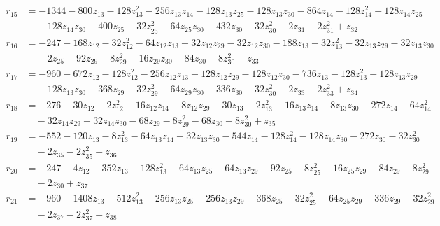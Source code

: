 \begin{align*}
r_{15} &= -1344 - 800z_{13} - 128z_{13}^{2} - 256z_{13}z_{14} - 128z_{13}z_{25} - 128z_{13}z_{30} - 864z_{14} - 128z_{14}^{2} - 128z_{14}z_{25} \\
&\quad  - 128z_{14}z_{30} - 400z_{25} - 32z_{25}^{2} - 64z_{25}z_{30} - 432z_{30} - 32z_{30}^{2} - 2z_{31} - 2z_{31}^{2} + z_{32}
\end{align*}
\begin{align*}
r_{16} &= -247 - 168z_{12} - 32z_{12}^{2} - 64z_{12}z_{13} - 32z_{12}z_{29} - 32z_{12}z_{30} - 188z_{13} - 32z_{13}^{2} - 32z_{13}z_{29} - 32z_{13}z_{30} \\
&\quad  - 2z_{25} - 92z_{29} - 8z_{29}^{2} - 16z_{29}z_{30} - 84z_{30} - 8z_{30}^{2} + z_{33}
\end{align*}
\begin{align*}
r_{17} &= -960 - 672z_{12} - 128z_{12}^{2} - 256z_{12}z_{13} - 128z_{12}z_{29} - 128z_{12}z_{30} - 736z_{13} - 128z_{13}^{2} - 128z_{13}z_{29} \\
&\quad  - 128z_{13}z_{30} - 368z_{29} - 32z_{29}^{2} - 64z_{29}z_{30} - 336z_{30} - 32z_{30}^{2} - 2z_{33} - 2z_{33}^{2} + z_{34}
\end{align*}
\begin{align*}
r_{18} &= -276 - 30z_{12} - 2z_{12}^{2} - 16z_{12}z_{14} - 8z_{12}z_{29} - 30z_{13} - 2z_{13}^{2} - 16z_{13}z_{14} - 8z_{13}z_{30} - 272z_{14} - 64z_{14}^{2} \\
&\quad  - 32z_{14}z_{29} - 32z_{14}z_{30} - 68z_{29} - 8z_{29}^{2} - 68z_{30} - 8z_{30}^{2} + z_{35}
\end{align*}
\begin{align*}
r_{19} &= -552 - 120z_{13} - 8z_{13}^{2} - 64z_{13}z_{14} - 32z_{13}z_{30} - 544z_{14} - 128z_{14}^{2} - 128z_{14}z_{30} - 272z_{30} - 32z_{30}^{2} \\
&\quad  - 2z_{35} - 2z_{35}^{2} + z_{36}
\end{align*}
\begin{align*}
r_{20} &= -247 - 4z_{12} - 352z_{13} - 128z_{13}^{2} - 64z_{13}z_{25} - 64z_{13}z_{29} - 92z_{25} - 8z_{25}^{2} - 16z_{25}z_{29} - 84z_{29} - 8z_{29}^{2} \\
&\quad  - 2z_{30} + z_{37}
\end{align*}
\begin{align*}
r_{21} &= -960 - 1408z_{13} - 512z_{13}^{2} - 256z_{13}z_{25} - 256z_{13}z_{29} - 368z_{25} - 32z_{25}^{2} - 64z_{25}z_{29} - 336z_{29} - 32z_{29}^{2} \\
&\quad  - 2z_{37} - 2z_{37}^{2} + z_{38}
\end{align*}
